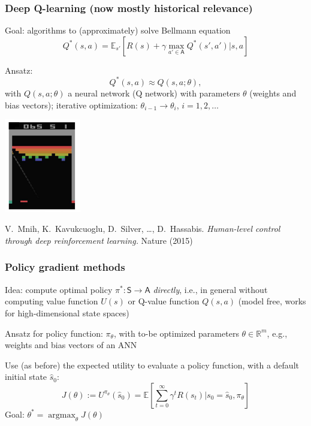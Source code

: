 \documentclass[t]{beamer}
\newcommand{\R}{{\mathbb{R}}}
\DeclareMathOperator*{\argmax}{argmax}
\begin{document}
\begin{frame}
\frametitle{Deep Q-learning {\footnotesize(now mostly historical relevance)}}
Goal: algorithms to (approximately) solve Bellmann equation
\[
Q^*(s, a) = \mathbb{E}_{s'}\!\left[ R(s) + \gamma \max_{a' \in \mathsf{A}} Q^*(s',a') \Big\vert s, a \right]
\]

\vspace{-0.5\baselineskip}

Ansatz:
\[
Q^*(s,a) \approx Q(s, a; \theta),
\]
with $Q(s, a; \theta)$ a neural network (Q network) with parameters $\theta$ (weights and bias vectors); iterative optimization: $\theta_{i-1} \to \theta_i$, $i = 1, 2, \dots$

\vspace{-\baselineskip}
\begin{center}
\includegraphics[width=0.25\textwidth]{breakout_frame}
\end{center}

\vspace{-\baselineskip}

{\small
V.~Mnih, K.~Kavukcuoglu, D.~Silver, \dots, D.~Hassabis. \emph{Human-level control through deep reinforcement learning.} Nature (2015) \nocite{Mnih2015}
}
\end{frame}



\begin{frame}
\frametitle{Policy gradient methods}
Idea: compute optimal policy $\pi^*: \mathsf{S} \to \mathsf{A}$ \emph{directly}, i.e., in general without computing value function $U(s)$ or Q-value function $Q(s, a)$ (model free, works for high-dimensional state spaces)

Ansatz for policy function: $\pi_{\theta}$, with to-be optimized parameters $\theta \in \R^m$, e.g., weights and bias vectors of an ANN

Use (as before) the expected utility to evaluate a policy function, with a default initial state $\hat{s}_0$:
\[
J(\theta) := U^{\pi_{\theta}}(\hat{s}_0) = \mathbb{E}\!\left[ \sum_{t=0}^\infty \gamma^t R(s_t) \Big\vert s_0 = \hat{s}_0, \pi_{\theta} \right]
\]
Goal: $\theta^* = \argmax_{\theta} J(\theta)$
\end{frame}
\end{document}
